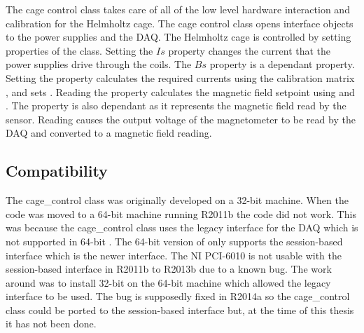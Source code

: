 The cage control class takes care of all of the low level hardware interaction and calibration for the Helmholtz cage. The cage control class opens interface objects to the power supplies and the \ac{DAQ}. The Helmholtz cage is controlled by setting properties of the class. Setting the \lstMat$Is$ property changes the current that the power supplies drive through the coils. The \lstMat$Bs$ property is a dependant property. Setting the  property calculates the required currents using the calibration matrix , and sets . Reading the  property calculates the magnetic field setpoint using  and . The  property is also dependant as it represents the magnetic field read by the sensor. Reading  causes the output voltage of the magnetometer to be read by the \ac{DAQ} and converted to a magnetic field reading.

\subsection{Compatibility}

The cage\_control class was originally developed on a 32-bit machine. When the code was moved to a 64-bit machine running \matlab R2011b the code did not work. This was because the cage\_control class uses the legacy interface for the \ac{DAQ} which is not supported in 64-bit \matlab. The 64-bit version of \matlab only supports the session-based interface which is the newer interface. The NI PCI-6010 is not usable with the session-based interface in \matlab R2011b to R2013b due to a known bug. The work around was to install 32-bit \matlab on the 64-bit machine which allowed the legacy interface to be used. The bug is supposedly fixed in \matlab R2014a so the cage\_control class could be ported to the session-based interface but, at the time of this thesis it has not been done.

